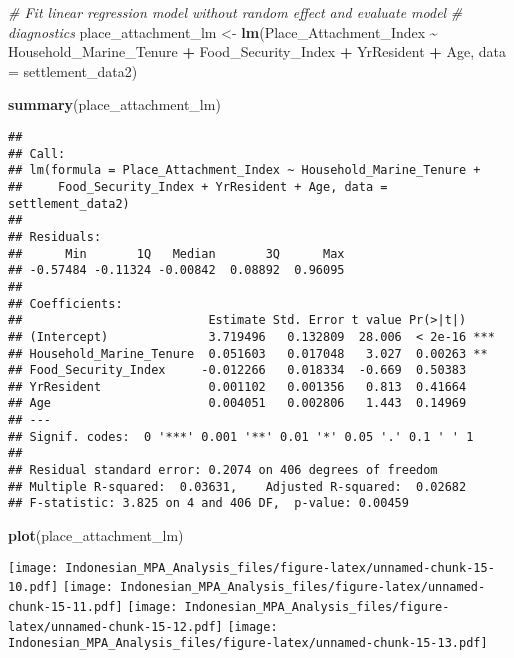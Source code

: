 \documentclass[
]{article}
\newenvironment{Shaded}{\begin{snugshade}}{\end{snugshade}}
\newcommand{\AttributeTok}[1]{\textcolor[rgb]{0.13,0.29,0.53}{#1}}
\newcommand{\CommentTok}[1]{\textcolor[rgb]{0.56,0.35,0.01}{\textit{#1}}}
\newcommand{\FunctionTok}[1]{\textcolor[rgb]{0.13,0.29,0.53}{\textbf{#1}}}
\newcommand{\NormalTok}[1]{#1}
\newcommand{\OtherTok}[1]{\textcolor[rgb]{0.56,0.35,0.01}{#1}}
\newcommand{\SpecialCharTok}[1]{\textcolor[rgb]{0.81,0.36,0.00}{\textbf{#1}}}
\begin{document}
\begin{Shaded}
\begin{Highlighting}[]
\CommentTok{\# Fit linear regression model without random effect and evaluate model}
\CommentTok{\# diagnostics}
\NormalTok{place\_attachment\_lm }\OtherTok{\textless{}{-}} \FunctionTok{lm}\NormalTok{(Place\_Attachment\_Index }\SpecialCharTok{\textasciitilde{}} 
\NormalTok{                            Household\_Marine\_Tenure }\SpecialCharTok{+}
\NormalTok{                            Food\_Security\_Index }\SpecialCharTok{+}
\NormalTok{                            YrResident }\SpecialCharTok{+}
\NormalTok{                            Age, }\AttributeTok{data =}\NormalTok{ settlement\_data2)}

\FunctionTok{summary}\NormalTok{(place\_attachment\_lm)}
\end{Highlighting}
\end{Shaded}

\begin{verbatim}
## 
## Call:
## lm(formula = Place_Attachment_Index ~ Household_Marine_Tenure + 
##     Food_Security_Index + YrResident + Age, data = settlement_data2)
## 
## Residuals:
##      Min       1Q   Median       3Q      Max 
## -0.57484 -0.11324 -0.00842  0.08892  0.96095 
## 
## Coefficients:
##                          Estimate Std. Error t value Pr(>|t|)    
## (Intercept)              3.719496   0.132809  28.006  < 2e-16 ***
## Household_Marine_Tenure  0.051603   0.017048   3.027  0.00263 ** 
## Food_Security_Index     -0.012266   0.018334  -0.669  0.50383    
## YrResident               0.001102   0.001356   0.813  0.41664    
## Age                      0.004051   0.002806   1.443  0.14969    
## ---
## Signif. codes:  0 '***' 0.001 '**' 0.01 '*' 0.05 '.' 0.1 ' ' 1
## 
## Residual standard error: 0.2074 on 406 degrees of freedom
## Multiple R-squared:  0.03631,    Adjusted R-squared:  0.02682 
## F-statistic: 3.825 on 4 and 406 DF,  p-value: 0.00459
\end{verbatim}

\begin{Shaded}
\begin{Highlighting}[]
\FunctionTok{plot}\NormalTok{(place\_attachment\_lm)}
\end{Highlighting}
\end{Shaded}

\texttt{[image: Indonesian\_MPA\_Analysis\_files/figure-latex/unnamed-chunk-15-10.pdf]}
\texttt{[image: Indonesian\_MPA\_Analysis\_files/figure-latex/unnamed-chunk-15-11.pdf]}
\texttt{[image: Indonesian\_MPA\_Analysis\_files/figure-latex/unnamed-chunk-15-12.pdf]}
\texttt{[image: Indonesian\_MPA\_Analysis\_files/figure-latex/unnamed-chunk-15-13.pdf]}
\end{document}
